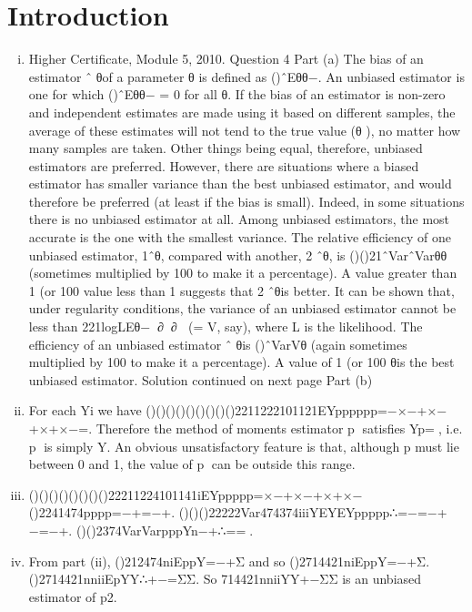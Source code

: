 \documentclass{article}
\author{kobriendublin }
\date{December 2018}
\begin{document}
\section{Introduction}
\begin{enumerate}[(i)]
\item Higher Certificate, Module 5, 2010. Question 4
Part (a)
The bias of an estimator ˆ
θof a parameter θ is defined as ()ˆEθθ−.
An unbiased estimator is one for which ()ˆEθθ− = 0 for all θ.
If the bias of an estimator is non-zero and independent estimates are made using it based on different samples, the average of these estimates will not tend to the true value (θ ), no matter how many samples are taken. Other things being equal, therefore, unbiased estimators are preferred. However, there are situations where a biased estimator has smaller variance than the best unbiased estimator, and would therefore be preferred (at least if the bias is small). Indeed, in some situations there is no unbiased estimator at all.
Among unbiased estimators, the most accurate is the one with the smallest variance. The relative efficiency of one unbiased estimator, 1ˆθ, compared with another, 2
ˆθ, is
()()21ˆVarˆVarθθ
(sometimes multiplied by 100 to make it a percentage). A value greater than 1 (or 100%
value less than 1
suggests that 2
ˆθis better.
It can be shown that, under regularity conditions, the variance of an unbiased estimator cannot be less than
221logLEθ−∂∂ (= V, say),
where L is the likelihood. The efficiency of an unbiased estimator ˆ
θis ()ˆVarVθ (again sometimes multiplied by 100 to make it a percentage). A value of 1 (or 100%
θis the best unbiased estimator.
Solution continued on next page
Part (b)
\item For each Yi we have ()()()()()()()()()2211222101121EYpppppp=−×−+×−+×+×−=.
Therefore the method of moments estimator p satisfies Yp=, i.e. p is simply Y.
An obvious unsatisfactory feature is that, although p must lie between 0 and 1, the value of p can be outside this range.
\item ()()()()()()()()22211224101141iEYppppp=×−+×−+×+×− ()2241474pppp=−+=−+.
()()(){}22222Var474374iiiYEYEYppppp∴=−=−+−=−+.
()()2374VarVarpppYn−+∴==.
\item From part (ii), ()212474niEppY=−+Σ and so ()2714421niEppY=−+Σ.
()2714421nniiEpYY∴+−=ΣΣ.
So 714421nniiYY+−ΣΣ is an unbiased estimator of p2.
\end{enumerate}
\end{document}

